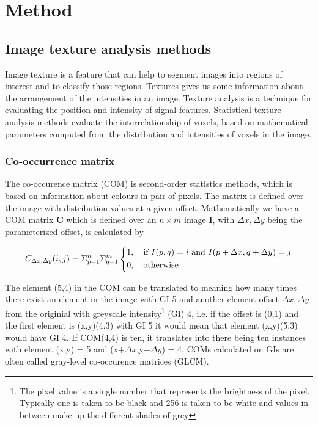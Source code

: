 \chapter{Method}


\section{Image texture analysis methods}

Image texture is a feature that can help to segment images into regions of interest and to classify those regions. Textures gives us some information about the arrangement of the intensities in an image. Texture analysis is a technique for evaluating the position and intensity of signal features\cite{Castellano}. Statistical texture analysis methods evaluate the interrelationship of voxels, based on mathematical parameters computed from the distribution and intensities of voxels in the image.

\subsection{Co-occurrence matrix}

The co-occurence matrix (COM) is second-order statistics methods, which is based on information about colours in pair of pixels. The matrix is defined over the image with distribution values at a given offset. Mathematically we have a COM matrix \textbf{C} which is defined over an $n \times m$ image \textbf{I}, with $\Delta x, \Delta y$ being the parameterized offset, is calculated by

\[
C_{\Delta x, \Delta y}(i, j) = \Sigma_{p=1}^n\Sigma_{q=1}^m
\begin{dcases}
  1, \quad \text{if } I(p,q)=i \text{ and } I(p+\Delta x, q+ \Delta y) =j \\
  0, \quad \text{otherwise}
\end{dcases}
\]

The element (5,4) in the COM can be translated to meaning how many times there exist an element in the image with GI  5 and another element offset $\Delta x, \Delta y$ from the originial with greyscale intensity\footnote{The pixel value is a single number that represents the brightness of the pixel. Typically one is taken to be black and 256 is taken to be white and values in between make up the different shades of grey} (GI) 4, i.e. if the offset is (0,1) and the first element is (x,y)(4,3) with GI 5 it would mean that element (x,y)(5,3) would have GI 4. If COM(4,4) is ten, it translates into there being ten instances with element (x,y) = 5 and (x+$\Delta x$,y+$\Delta y$) = 4.
COMs calculated on GIs are often called gray-level co-occurence matrices (GLCM).

